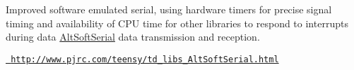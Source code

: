 Improved software emulated serial, using hardware timers for precise signal timing and availability of C\+PU time for other libraries to respond to interrupts during data \mbox{\hyperlink{class_alt_soft_serial}{Alt\+Soft\+Serial}} data transmission and reception.

\href{http://www.pjrc.com/teensy/td_libs_AltSoftSerial.html}{\texttt{ http\+://www.\+pjrc.\+com/teensy/td\+\_\+libs\+\_\+\+Alt\+Soft\+Serial.\+html}}

 